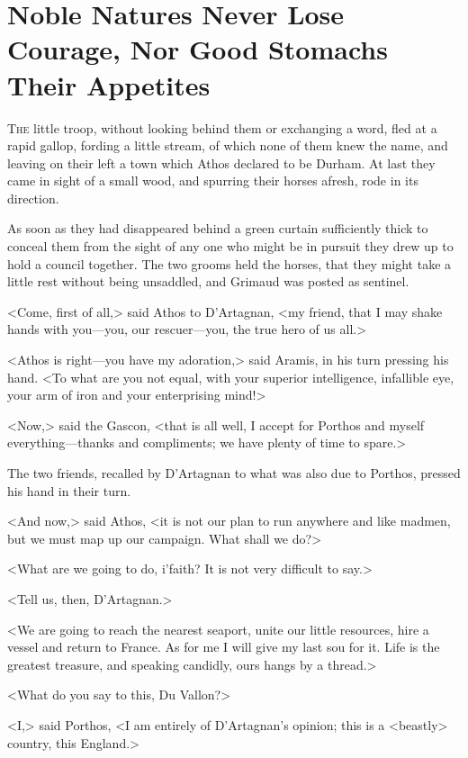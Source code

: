 \chapter[Noble Natures Never Lose Courage]{Noble Natures Never Lose Courage, Nor Good Stomachs Their Appetites}
 \lettrine{T}{he} little troop, without looking behind them or exchanging a word, fled at a rapid gallop, fording a little stream, of which none of them knew the name, and leaving on their left a town which Athos declared to be Durham. At last they came in sight of a small wood, and spurring their horses afresh, rode in its direction.

As soon as they had disappeared behind a green curtain sufficiently thick to conceal them from the sight of any one who might be in pursuit they drew up to hold a council together. The two grooms held the horses, that they might take a little rest without being unsaddled, and Grimaud was posted as sentinel.

<Come, first of all,> said Athos to D'Artagnan, <my friend, that I may shake hands with you—you, our rescuer—you, the true hero of us all.>

<Athos is right—you have my adoration,> said Aramis, in his turn pressing his hand. <To what are you not equal, with your superior intelligence, infallible eye, your arm of iron and your enterprising mind!>

<Now,> said the Gascon, <that is all well, I accept for Porthos and myself everything—thanks and compliments; we have plenty of time to spare.>

The two friends, recalled by D'Artagnan to what was also due to Porthos, pressed his hand in their turn.

<And now,> said Athos, <it is not our plan to run anywhere and like madmen, but we must map up our campaign. What shall we do?>

<What are we going to do, i'faith? It is not very difficult to say.>

<Tell us, then, D'Artagnan.>

<We are going to reach the nearest seaport, unite our little resources, hire a vessel and return to France. As for me I will give my last sou for it. Life is the greatest treasure, and speaking candidly, ours hangs by a thread.>

<What do you say to this, Du Vallon?>

<I,> said Porthos, <I am entirely of D'Artagnan's opinion; this is a <beastly> country, this England.>

